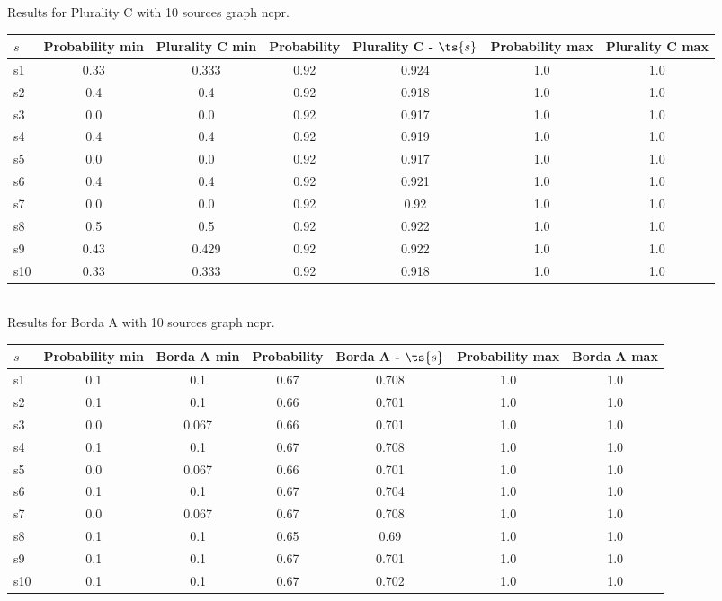 \documentclass{article}
\begin{document}
\noindent Results for Plurality C with 10 sources graph ncpr.

\noindent\begin{tabular}{|l|c|c|c|c|c|c|}
\hline
$s$& Probability min & Plurality C min & Probability & Plurality C - $\ts{s}$ & Probability max & Plurality C max\\
\hline
s1 &0.33 & 0.333 & 0.92 & 0.924 & 1.0 & 1.0\\
\hline
s2 &0.4 & 0.4 & 0.92 & 0.918 & 1.0 & 1.0\\
\hline
s3 &0.0 & 0.0 & 0.92 & 0.917 & 1.0 & 1.0\\
\hline
s4 &0.4 & 0.4 & 0.92 & 0.919 & 1.0 & 1.0\\
\hline
s5 &0.0 & 0.0 & 0.92 & 0.917 & 1.0 & 1.0\\
\hline
s6 &0.4 & 0.4 & 0.92 & 0.921 & 1.0 & 1.0\\
\hline
s7 &0.0 & 0.0 & 0.92 & 0.92 & 1.0 & 1.0\\
\hline
s8 &0.5 & 0.5 & 0.92 & 0.922 & 1.0 & 1.0\\
\hline
s9 &0.43 & 0.429 & 0.92 & 0.922 & 1.0 & 1.0\\
\hline
s10 &0.33 & 0.333 & 0.92 & 0.918 & 1.0 & 1.0\\
\hline
\end{tabular}\\

\noindent Results for Borda A with 10 sources graph ncpr.

\noindent\begin{tabular}{|l|c|c|c|c|c|c|}
\hline
$s$& Probability min & Borda A min & Probability & Borda A - $\ts{s}$ & Probability max & Borda A max\\
\hline
s1 &0.1 & 0.1 & 0.67 & 0.708 & 1.0 & 1.0\\
\hline
s2 &0.1 & 0.1 & 0.66 & 0.701 & 1.0 & 1.0\\
\hline
s3 &0.0 & 0.067 & 0.66 & 0.701 & 1.0 & 1.0\\
\hline
s4 &0.1 & 0.1 & 0.67 & 0.708 & 1.0 & 1.0\\
\hline
s5 &0.0 & 0.067 & 0.66 & 0.701 & 1.0 & 1.0\\
\hline
s6 &0.1 & 0.1 & 0.67 & 0.704 & 1.0 & 1.0\\
\hline
s7 &0.0 & 0.067 & 0.67 & 0.708 & 1.0 & 1.0\\
\hline
s8 &0.1 & 0.1 & 0.65 & 0.69 & 1.0 & 1.0\\
\hline
s9 &0.1 & 0.1 & 0.67 & 0.701 & 1.0 & 1.0\\
\hline
s10 &0.1 & 0.1 & 0.67 & 0.702 & 1.0 & 1.0\\
\hline
\end{tabular}\\
\end{document}
